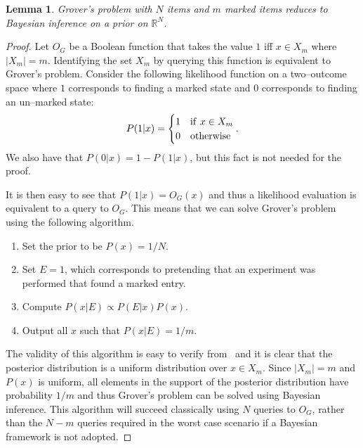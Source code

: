 \documentclass[aps,amsmath,onecolumn,amssymb,notitlepage]{revtex4-1}
\newtheorem{lemma}{Lemma}
\begin{document}
\begin{lemma}\label{lem:reduce}
Grover's problem with $N$ items and $m$ marked items reduces to Bayesian inference on a prior on $\mathbb{R}^N$.
\end{lemma}
\begin{proof}
Let $O_G$ be a Boolean function that takes the value $1$ iff $x\in X_m$ where $|X_m|=m$.  Identifying the set $X_m$ by querying this function is equivalent to Grover's problem.  Consider the following likelihood function on a two--outcome space where $1$ corresponds to finding a marked state and $0$ corresponds to finding an un--marked state:
\begin{equation}
P(1|x) = \begin{cases} 1 & {\rm if~}x\in X_m\\ 0& {\rm otherwise} \end{cases}.\label{eq:reduceLikelihood}
\end{equation}
We also have that $P(0|x)=1-P(1|x)$, but this fact is not needed for the proof.

It is then easy to see that $P(1|x)=O_G(x)$ and thus a likelihood evaluation is equivalent to a query to $O_G$.  This means that we can solve Grover's problem using the following algorithm.  \begin{enumerate}
\item Set the prior to be $P(x) = 1/N$.
\item Set $E=1$, which corresponds to pretending that an experiment was performed that found a marked entry.  
\item Compute $P(x|E) \propto P(E|x)P(x)$.  
\item Output all $x$ such that $P(x|E)=1/m$.
\end{enumerate}

The validity of this algorithm is easy to verify from~ and it is clear that the posterior distribution is a uniform distribution over $x\in X_m$.  Since $|X_m|=m$ and $P(x)$ is uniform, all elements in the support of the posterior distribution have probability $1/m$ and thus Grover's problem can be solved using Bayesian inference.  This algorithm will succeed classically using $N$ queries to $O_G$, rather than the $N-m$ queries required in the worst case scenario if a Bayesian framework is not adopted.


\end{proof}
\end{document}
